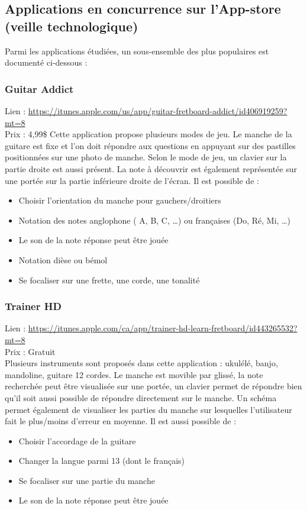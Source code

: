 \documentclass{scrreprt}
\begin{document}
\subsection{Applications en concurrence sur l’App-store (veille technologique)}

Parmi les applications étudiées, un sous-ensemble des plus populaires est documenté ci-dessous :

\subsubsection{Guitar Addict} 
Lien : \url{https://itunes.apple.com/us/app/guitar-fretboard-addict/id406919259?mt=8}\\
Prix : 4,99\$
Cette application propose plusieurs modes de jeu. Le manche de la guitare est fixe et l’on doit répondre aux questions en appuyant sur des pastilles positionnées sur une photo de manche.
Selon le mode de jeu, un clavier sur la partie droite est aussi présent. La note à découvrir est également  représentée sur une portée sur la partie inférieure droite de l’écran.
Il est possible de :
\begin{itemize}
\item Choisir l’orientation du manche pour gauchers/droitiers 
\item Notation des notes anglophone ( A, B, C, …) ou françaises (Do, Ré, Mi, …)
\item Le son de la note réponse peut être jouée
\item Notation dièse ou bémol
\item Se focaliser sur une frette, une corde, une tonalité
\end{itemize}

\subsubsection{Trainer HD}
Lien : \url{https://itunes.apple.com/ca/app/trainer-hd-learn-fretboard/id443265532?mt=8}\\
Prix : Gratuit\\
Plusieurs instruments sont proposés dans cette application : ukulélé, banjo, mandoline, guitare 12 cordes.
Le manche est movible par glissé, la note recherchée peut être visualisée sur une portée, un clavier permet de répondre bien qu’il soit aussi possible de répondre directement sur le manche. Un schéma permet également de visualiser les parties du manche sur lesquelles l’utilisateur fait le plus/moins d’erreur en moyenne.
Il est aussi possible de :
\begin{itemize}
\item Choisir l’accordage de la guitare
\item Changer la langue parmi 13 (dont le français)
\item Se focaliser sur une partie du manche
\item Le son de la note réponse peut être jouée 
\end{itemize}
\end{document}
